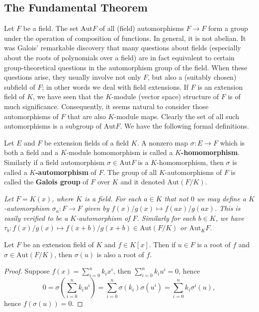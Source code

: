 \subsection{The Fundamental Theorem}
Let $F$ be a field. The set $\mathrm{Aut}F$ of all (field) automorphisms $F\to F$ form a group under the operation of composition of functions. In general, it is not abelian. It was Galois' remarkable discovery that many questions about fields (especially about the roots of polynomials over a field) are in fact equivalent to certain group-theoretical questions in the automorphism group of the field. When these questions arise, they usually involve not only $F$, but also a (suitably chosen) subfield of $F$; in other words we deal with field extensions. 
If $F$ is an extension field of $K$, we have seen that the $K$-module (vector space) structure of $F$ is of much significance. Consequently, it seems natural to consider those automorphisms of $F$ that are also $K$-module maps. Clearly the set of all such automorphisms is a subgroup of $\mathrm{Aut}F$. We have the following formal definitions.
\begin{definition}
Let $E$ and $F$ be extension fields of a field $K$. A nonzero map $\sigma:E\to F$ which is both a field and a $K$-module homomorphism is called a \textbf{$K$-homomorphism}. Similarly if a field automorphism $\sigma\in\mathrm{Aut}F$ is a $K$-homomorphism, then $\sigma$ is called a \textbf{$K$-automorphism} of $F$. The group of all $K$-automorphisms of $F$ is called the \textbf{Galois group} of $F$ over $K$ and it denoted $\mathrm{Aut}(F/K)$.
\end{definition}
\begin{example}\em
Let $F=K(x)$, where $K$ is a field. For each $a\in K$ that not $0$ we may define a $K$-automorphism $\sigma_a:F\to F$ given by $f(x)/g(x)\mapsto f(ax)/g(ax)$. This is easily verified to be a $K$-automorphism of $F$. Similarly for each $b\in K$, we have $\tau_b:f(x)/g(x)\mapsto f(x+b)/g(x+b)\in\mathrm{Aut}(F/K)$ or $\mathrm{Aut}_KF$.
\end{example}
\begin{theorem}
Let $F$ be an extension field of $K$ and $f\in K[x]$. Then if $u\in F$ is a root of $f$ and $\sigma\in\mathrm{Aut}(F/K)$, then $\sigma(u)$ is also a root of $f$.
\end{theorem}
\begin{proof}
Suppose $f(x)=\sum_{i=0}^nk_ix^i$, then $\sum_{i=0}^nk_iu^i=0$, hence 
$$
0=\sigma \left( \sum_{i=0}^n{k_iu^i} \right) =\sum_{i=0}^n{\sigma \left( k_i \right) \sigma \left( u^i \right)}=\sum_{i=0}^n{k_i\sigma ^i\left( u \right)},
$$
hence $f(\sigma(u))=0$.
\end{proof}

